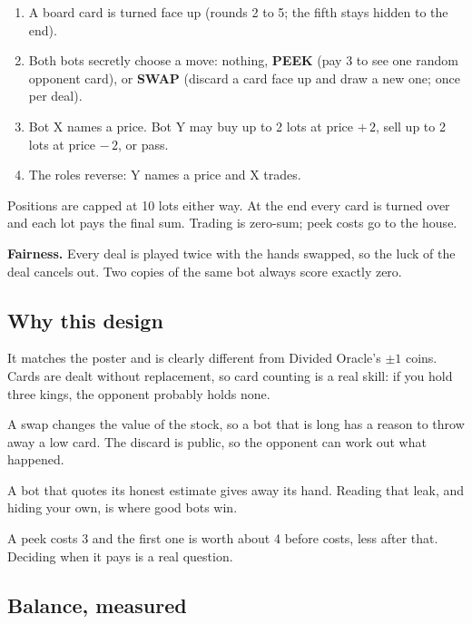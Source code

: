 \documentclass[11pt,a4paper]{article}
\begin{document}
\begin{enumerate}
  \item A board card is turned face up (rounds 2 to 5; the fifth stays hidden to the end).
  \item Both bots secretly choose a move: nothing, \textbf{PEEK} (pay 3 to see one random
        opponent card), or \textbf{SWAP} (discard a card face up and draw a new one; once per
        deal).
  \item Bot X names a price. Bot Y may buy up to 2 lots at price $+\,2$, sell up to 2 lots at
        price $-\,2$, or pass.
  \item The roles reverse: Y names a price and X trades.
\end{enumerate}

Positions are capped at 10 lots either way. At the end every card is turned over and each lot
pays the final sum. Trading is zero-sum; peek costs go to the house.

\textbf{Fairness.} Every deal is played twice with the hands swapped, so the luck of the deal
cancels out. Two copies of the same bot always score exactly zero.

\subsection{Why this design}

\begin{description}[leftmargin=0pt,style=nextline]
  \item[Cards, not coins.] It matches the poster and is clearly different from Divided
    Oracle's $\pm1$ coins. Cards are dealt without replacement, so card counting is a real
    skill: if you hold three kings, the opponent probably holds none.
  \item[Every move has a consequence.] A swap changes the value of the stock, so a bot that is
    long has a reason to throw away a low card. The discard is public, so the opponent can work
    out what happened.
  \item[Prices leak information.] A bot that quotes its honest estimate gives away its hand.
    Reading that leak, and hiding your own, is where good bots win.
  \item[Information has a price.] A peek costs 3 and the first one is worth about 4 before
    costs, less after that. Deciding when it pays is a real question.
\end{description}

\subsection{Balance, measured}
\end{document}
